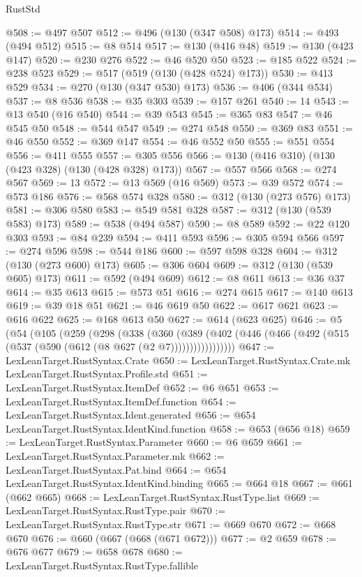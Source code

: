 \begin{lexlean}{RustStd}
\begin{coremodule}
@508 := @497 @507
@512 := @496 (@130 (@347 @508) @173)
@514 := @493 (@494 @512)
@515 := @8 @514
@517 := @130 (@416 @48)
@519 := @130 (@423 @147)
@520 := @230 @276
@522 := @46 @520 @50
@523 := @185 @522
@524 := @238 @523
@529 := @517 (@519 (@130 (@428 @524) @173))
@530 := @413 @529
@534 := @270 (@130 (@347 @530) @173)
@536 := @406 (@344 @534)
@537 := @8 @536
@538 := @35 @303
@539 := @157 @261
@540 := 14
@543 := @13 @540 (@16 @540)
@544 := @39 @543
@545 := @365 @83
@547 := @46 @545 @50
@548 := @544 @547
@549 := @274 @548
@550 := @369 @83
@551 := @46 @550
@552 := @369 @147
@554 := @46 @552 @50
@555 := @551 @554
@556 := @411 @555
@557 := @305 @556
@566 := @130 (@416 @310) (@130 (@423 @328) (@130 (@428 @328) @173))
@567 := @557 @566
@568 := @274 @567
@569 := 13
@572 := @13 @569 (@16 @569)
@573 := @39 @572
@574 := @573 @186
@576 := @568 @574 @328
@580 := @312 (@130 (@273 @576) @173)
@581 := @306 @580
@583 := @549 @581 @328
@587 := @312 (@130 (@539 @583) @173)
@589 := @538 (@494 @587)
@590 := @8 @589
@592 := @22 @120 @303
@593 := @84 @239
@594 := @411 @593
@596 := @305 @594 @566
@597 := @274 @596
@598 := @544 @186
@600 := @597 @598 @328
@604 := @312 (@130 (@273 @600) @173)
@605 := @306 @604
@609 := @312 (@130 (@539 @605) @173)
@611 := @592 (@494 @609)
@612 := @8 @611
@613 := @36 @37
@614 := @35 @613
@615 := @573 @51
@616 := @274 @615
@617 := @140 @613
@619 := @39 @18 @51
@621 := @46 @619 @50
@622 := @617 @621
@623 := @616 @622
@625 := @168 @613 @50
@627 := @614 (@623 @625)
@646 := @5
    (@54
      (@105
        (@259
          (@298
            (@338
              (@360
                (@389
                  (@402 (@446 (@466 (@492 (@515 (@537 (@590 (@612 (@8 @627 (@2 @7)))))))))))))))))
@647 := LexLeanTarget.RustSyntax.Crate
@650 := LexLeanTarget.RustSyntax.Crate.mk LexLeanTarget.RustSyntax.Profile.std
@651 := LexLeanTarget.RustSyntax.ItemDef
@652 := @6 @651
@653 := LexLeanTarget.RustSyntax.ItemDef.function
@654 := LexLeanTarget.RustSyntax.Ident.generated
@656 := @654 LexLeanTarget.RustSyntax.IdentKind.function
@658 := @653 (@656 @18)
@659 := LexLeanTarget.RustSyntax.Parameter
@660 := @6 @659
@661 := LexLeanTarget.RustSyntax.Parameter.mk
@662 := LexLeanTarget.RustSyntax.Pat.bind
@664 := @654 LexLeanTarget.RustSyntax.IdentKind.binding
@665 := @664 @18
@667 := @661 (@662 @665)
@668 := LexLeanTarget.RustSyntax.RustType.list
@669 := LexLeanTarget.RustSyntax.RustType.pair
@670 := LexLeanTarget.RustSyntax.RustType.str
@671 := @669 @670
@672 := @668 @670
@676 := @660 (@667 (@668 (@671 @672)))
@677 := @2 @659
@678 := @676 @677
@679 := @658 @678
@680 := LexLeanTarget.RustSyntax.RustType.fallible

\end{coremodule}
\end{lexlean}
